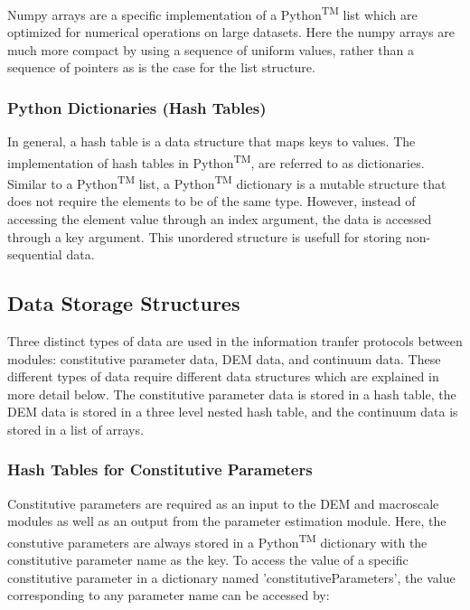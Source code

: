 Numpy arrays are a specific implementation of a Python\textsuperscript{TM} list which are optimized for numerical operations on large datasets. Here the numpy arrays are much more compact by using a sequence of uniform values, rather than a sequence of pointers as is the case for the list structure.

\subsubsection*{Python Dictionaries (Hash Tables)}

In general, a hash table is a data structure that maps keys to values. The implementation of hash tables in Python\textsuperscript{TM}, are referred to as dictionaries. Similar to a Python\textsuperscript{TM} list, a Python\textsuperscript{TM} dictionary is a mutable structure that does not require the elements to be of the same type. However, instead of accessing the element value through an index argument, the data is accessed through a key argument. This unordered structure is usefull for storing non-sequential data.

\subsection{Data Storage Structures}

Three distinct types of data are used in the information tranfer protocols between modules: constitutive parameter data, DEM data, and continuum data. These different types of data require different data structures which are explained in more detail below. The constitutive parameter data is stored in a hash table, the DEM data is stored in a three level nested hash table, and the continuum data is stored in a list of arrays.

\subsubsection*{Hash Tables for Constitutive Parameters}

Constitutive parameters are required as an input to the DEM and macroscale modules as well as an output from the parameter estimation module. Here, the constutive parameters are always stored in a Python\textsuperscript{TM} dictionary with the constitutive parameter name as the key. To access the value of a specific constitutive parameter in a dictionary named 'constitutiveParameters', the value corresponding to any parameter name can be accessed by:


